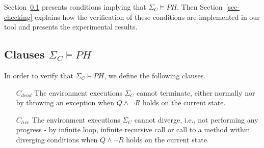 Section~\ref{sec-preservation} 
presents conditions implying that $\Sigma_C \models PH$. %
Then Section~\ref{sec-checking} explains how the verification
of these conditions are implemented in our tool and presents
the experimental results. 
%
\subsection{Clauses $\Sigma_C \models PH$}
\label{sec-preservation}


In order to verify that $\Sigma_C \models PH$, we define the following clauses. 
\begin{itemize}
\item[$C_{dead}$] The environment executions $\Sigma_{C}$ cannot terminate, either
normally nor by throwing an exception when $Q \wedge \neg R$
holds on the current state. 
\item[$C_{live}$] The environment executions $\Sigma_{C}$ cannot diverge, i.e.,
not performing any progress - by
infinite loop, infinite recursive call or call to a method
within diverging conditions when $Q \wedge \neg R$
holds on the current state.
\end{itemize}

